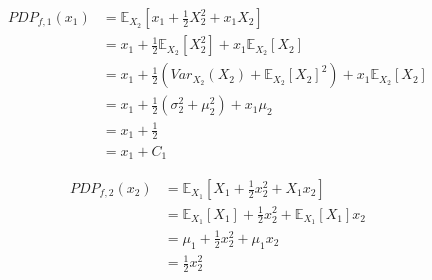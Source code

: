 \documentclass[runningheads]{llncs}
\begin{document}
\begin{align*}
    PDP_{f,1}(x_1) &= \mathbb{E}_{X_2}[x_1 + \frac{1}{2}X_2^2 + x_1 X_2] \\
                 &= x_1 + \frac{1}{2} \mathbb{E}_{X_2}[X_2^2] + x_1 \mathbb{E}_{X_2}[X_2] \\
                 &= x_1 + \frac{1}{2} (Var_{X_2}(X_2) + \mathbb{E}_{X_2}[X_2]^2) + x_1 \mathbb{E}_{X_2}[X_2] \\
                 &= x_1 + \frac{1}{2} (\sigma_2^2 + \mu_2^2) + x_1 \mu_2 \\
                 &= x_1 + \frac{1}{2} \\
                 &= x_1 + C_1
\end{align*}

\begin{align*}
    PDP_{f,2}(x_2) &= \mathbb{E}_{X_1}[X_1 + \frac{1}{2}x_2^2 + X_1 x_2] \\
                    &= \mathbb{E}_{X_1}[X_1] + \frac{1}{2}x_2^2 + \mathbb{E}_{X_1}[X_1] x_2 \\
                    &= \mu_1 + \frac{1}{2}x_2^2 + \mu_1 x_2 \\
                    &= \frac{1}{2}x_2^2
\end{align*}
\end{document}
